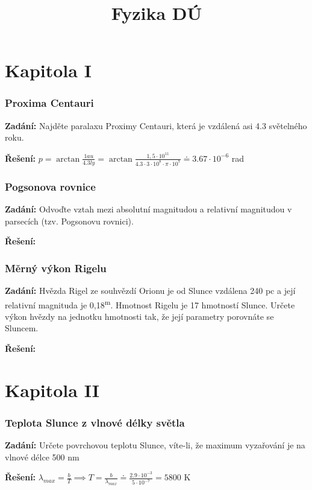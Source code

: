 \documentclass{article}
\title{\vspace{-2cm}Fyzika DÚ\vspace{-1.7cm}}
\date{}
\author{}
\begin{document}
\maketitle
\part*{Kapitola \textrm{I}}

\section*{Proxima Centauri}
\textbf{Zadání:} Najděte paralaxu Proximy Centauri, která je vzdálená asi 4.3 světelného roku.

\textbf{Řešení:} $p = \arctan \frac{1au}{4.3ly} = \arctan \frac{1,5 \cdot 10^{11}}{4.3\cdot 3 \cdot 10^{8} \cdot \pi \cdot 10^{7}} \doteq 3.67 \cdot 10^{-6}$ rad

\section*{Pogsonova rovnice}
\textbf{Zadání:} Odvoďte vztah mezi absolutní magnitudou a relativní magnitudou v parsecích (tzv. Pogsonovu rovnici).

\textbf{Řešení:}


\section*{Měrný výkon Rigelu}
\textbf{Zadání:} Hvězda Rigel ze souhvězdí Orionu je od Slunce vzdálena 240 pc a její relativní
magnituda je 0,18\textsuperscript{m}. Hmotnost Rigelu je 17 hmotností Slunce. Určete výkon hvězdy na jednotku
hmotnosti tak, že její parametry porovnáte se Sluncem.

\textbf{Řešení:}

\part*{Kapitola \textrm{I\hspace{-.1em}I}}

\section*{Teplota Slunce z vlnové délky světla}
\textbf{Zadání:} Určete povrchovou teplotu Slunce, víte-li, že maximum vyzařování je na vlnové délce
500 nm

\textbf{Řešení:} $\lambda_{max} = \frac{b}{T} \implies T = \frac{b}{\lambda_{max}} \doteq \frac{2.9 \cdot 10^{-3}}{5 \cdot 10^{-7}} = 5800$ K
\end{document}
